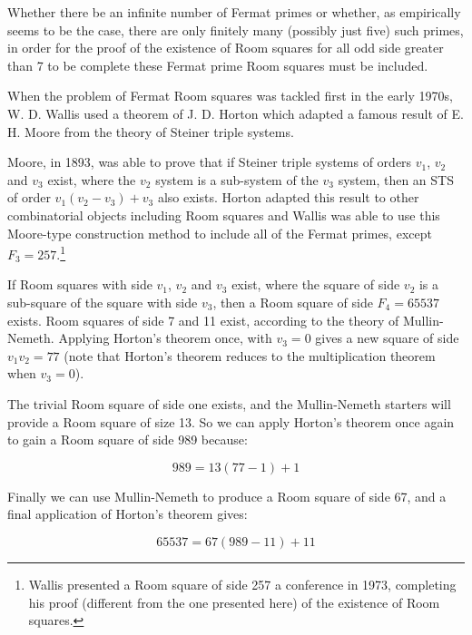 Whether there be an infinite number of Fermat primes or whether, as empirically seems to be the case, there are only finitely many (possibly just five) such primes, in order for the proof of the existence of Room squares for all odd side greater than 7 to be complete these Fermat prime Room squares must be included.

When the problem of Fermat Room squares was tackled first in the early 1970s, W. D. Wallis used a theorem of J. D. Horton which adapted a famous result of E. H. Moore from the theory of Steiner triple systems.

Moore, in 1893, was able to prove that if Steiner triple systems of orders $v_1$, $v_2$ and $v_3$ exist, where the $v_2$ system is a sub-system of the $v_3$ system, then an STS of order $v_1(v_2 - v_3) + v_3$ also exists.
Horton
\cite{hortonVariationsThemeMoore1970}
adapted this result to other combinatorial objects including Room squares and Wallis
\cite{wallisCombinatoricsRoomSquares2006}
was able to use this Moore-type construction method to include all of the Fermat primes, except $F_3 = 257$.\footnote{Wallis presented a Room square of side 257 a conference in 1973, completing his proof (different from the one presented here) of the existence of Room squares.}

\begin{example}
If Room squares with side $v_1$, $v_2$ and $v_3$ exist, where the square of side $v_2$ is a sub-square of the square with side $v_3$, then a Room square of side $F_4 = 65537$ exists.
Room squares of side 7 and 11 exist, according to the theory of Mullin-Nemeth.
Applying Horton’s theorem once, with $v_3 = 0$ gives a new square of side $v_1v_2 = 77$ (note that Horton’s theorem reduces to the multiplication theorem when $v_3 = 0$).

The trivial Room square of side one exists, and the Mullin-Nemeth starters will provide a Room square of size 13.
So we can apply Horton’s theorem once again to gain a Room square of side 989 because:

\begin{equation}
989 = 13(77 - 1) + 1
\end{equation}

Finally we can use Mullin-Nemeth to produce a Room square of side 67, and a final application of Horton’s theorem gives:

\begin{equation}
65537 = 67(989 - 11) + 11
\end{equation}
\end{example}

